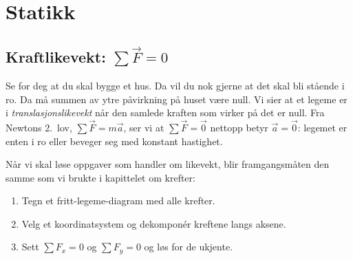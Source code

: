 \chapter{Statikk}
\label{Chapter:statikk}


\newpage

\section{Kraftlikevekt: \texorpdfstring{$\sum \vec{F} = 0$}{ΣF = 0}}

Se for deg at du skal bygge et hus. Da vil du nok gjerne at det skal bli stående i ro. Da må summen av ytre påvirkning på huset være null. Vi sier at et legeme er i \emph{translasjonslikevekt} når den samlede kraften som virker på det er null. Fra Newtons 2.\ lov, $\sum\vec{F} = m\vec{a}$, ser vi at $\sum\vec{F}=\vec{0}$ nettopp betyr $\vec{a}=\vec{0}$: legemet er enten i ro eller beveger seg med konstant hastighet.


Når vi skal løse oppgaver som handler om likevekt, blir framgangsmåten den samme som vi brukte i kapittelet om krefter:
\begin{enumerate}
  \item Tegn et fritt-legeme-diagram med alle krefter.
  \item Velg et koordinatsystem og dekomponér kreftene langs aksene.
  \item Sett $\sum F_x = 0$ og $\sum F_y = 0$ og løs for de ukjente.
\end{enumerate}

